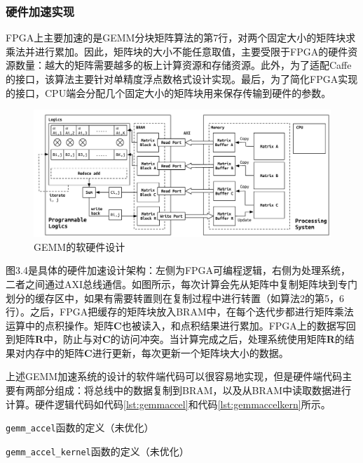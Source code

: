 \subsubsection{硬件加速实现}\label{subsubsec:normal}

FPGA上主要加速的是GEMM分块矩阵算法的第7行，对两个固定大小的矩阵块求乘法并进行累加。因此，矩阵块的大小不能任意取值，主要受限于FPGA的硬件资源数量：越大的矩阵需要越多的板上计算资源和存储资源。此外，为了适配Caffe的接口，该算法主要针对单精度浮点数格式设计实现。最后，为了简化FPGA实现的接口，CPU端会分配几个固定大小的矩阵块用来保存传输到硬件的参数。

\begin{figure}[!ht]
\centering
\includegraphics[width=\textwidth]{assets/imgs/gemm}
\caption{GEMM的软硬件设计}
\end{figure}

图3.4是具体的硬件加速设计架构：左侧为FPGA可编程逻辑，右侧为处理系统，二者之间通过AXI总线通信。如图所示，每次计算会先从矩阵中复制矩阵块到专门划分的缓存区中，如果有需要转置则在复制过程中进行转置（如算法2的第5，6行）。之后，FPGA把缓存的矩阵块放入BRAM中，在每个迭代步都进行矩阵乘法运算中的点积操作。矩阵$\mathbf{C}$也被读入，和点积结果进行累加。FPGA上的数据写回到矩阵$\mathbf{R}$中，防止与对$\mathbf{C}$的访问冲突。当计算完成之后，处理系统使用矩阵$\mathbf{R}$的结果对内存中的矩阵$\mathbf{C}$进行更新，每次更新一个矩阵块大小的数据。

上述GEMM加速系统的设计的软件端代码可以很容易地实现，但是硬件端代码主要有两部分组成：将总线中的数据复制到BRAM，以及从BRAM中读取数据进行计算。硬件逻辑代码如代码\ref{lst:gemmaccel}和代码\ref{lst:gemmaccelkern}所示。
\begin{listing}[!ht]

\caption{\texttt{gemm\_accel}函数的定义（未优化）}
\label{lst:gemmaccel}
\end{listing}

\begin{listing}[!ht]

\caption{\texttt{gemm\_accel\_kernel}函数的定义（未优化）}
\label{lst:gemmaccelkern}
\end{listing}


